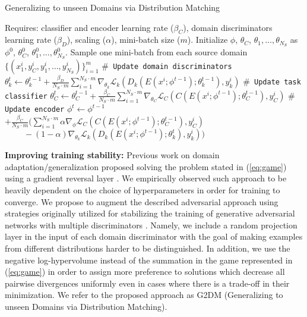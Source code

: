\documentclass{article}
\begin{document}
\begin{algorithm*}[h]
\caption{Generalizing to unseen Domains via Distribution Matching}\label{pseudo_code}
\begin{algorithmic}[1]
\STATE Requires: classifier and encoder learning rate ($\beta_C$), domain discriminators learning rate ($\beta_D$), scaling ($\alpha$), mini-batch size ($m$).
\STATE Initialize $\phi$, $\theta_C$, $\theta_1, \ldots, \theta_{N_S}$ as $\phi^0$, $\theta_C^0$, $\theta_1^0, \ldots, \theta_{N_S}^0$. 
\STATE Sample one mini-batch from each source domain $\{(x_1^i, y_C^i, y_1^i, \ldots, y_{N_S}^i)\}_{i=1}^{m}$
\STATE \texttt{$\#$ Update domain discriminators}
\STATE $\theta_k^{t} \gets \theta_k^{t-1} + \frac{\beta_D}{N_S \cdot m} \sum_{i=1}^{N_S \cdot m} \nabla_{\theta_k} \mathcal{L}_k(D_k(E(x^i; \phi^{t-1}); \theta_k^{t-1}), y_k^i)$
\ENDFOR
\STATE \texttt{$\#$ Update task classifier}
\STATE $\theta_C^{t}\gets \theta_C^{t-1} + \frac{\beta_C}{N_S \cdot m} \sum_{i=1}^{N_S \cdot m}\nabla_{\theta_C} \mathcal{L}_C (C(E(x^i; \phi^{t-1}); \theta_C^{t-1}), y_C^i)$
\STATE \texttt{$\#$ Update encoder}
\STATE $\phi^{t}\gets \phi^{t-1}$ $+ \frac{\beta_C}{N_S \cdot m} (\sum_{i=1}^{N_S \cdot m} \alpha \nabla_{\phi} \mathcal{L}_C (C(E(x^i; \phi^{t-1}); \theta_C^{t-1}), y_C^i)$ \\ 
$\; \qquad - (1-\alpha) \nabla_{\theta_k} \mathcal{L}_k(D_k(E(x^i; \phi^{t-1}); \theta_k^{t}), y_k^i))$
\ENDFOR
\end{algorithmic}
\end{algorithm*}

\textbf{Improving training stability:} Previous work on domain adaptation/generalization \cite{ganin2016domain,li2018deep} proposed solving the problem stated in (\ref{eq:game}) using a gradient reversal layer \cite{ganin2015unsupervised}. We empirically observed such approach to be heavily dependent on the choice of hyperparameters in order for training to converge. We propose to augment the described adversarial approach using strategies originally utilized for stabilizing the training of generative adversarial networks with multiple discriminators \cite{neyshabur2017stabilizing, albuquerque2019multi}. Namely, we include a random projection layer in the input of each domain discriminator with the goal of making examples from different distributions harder to be distinguished. In addition, we use the negative log-hypervolume instead of the summation in the game represented in (\ref{eq:game}) in order to assign more preference to solutions which decrease all pairwise divergences uniformly even in cases where there is a trade-off in their minimization. We refer to the proposed approach as G2DM (Generalizing to unseen Domains via Distribution Matching).
\end{document}
